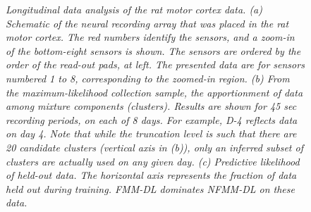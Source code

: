 \documentclass[journal]{IEEEtran}
\begin{document}
\begin{figure}[!htbp]
{ }
  \caption{\small \emph{
{Longitudinal data analysis of the rat motor cortex data. }
(a) Schematic of the neural
recording array that was placed in the rat motor cortex. The red
numbers identify the sensors, and a zoom-in of the bottom-eight
sensors is shown. The sensors are ordered by the order of the
read-out pads, at left. The presented data are for sensors numbered 1 to 8, corresponding to the zoomed-in region. (b) From the maximum-likelihood collection
sample, the apportionment of data among mixture components
(clusters). Results are shown for 45 sec recording periods, on each
of 8 days. For example, D-4 reflects data on day 4. Note that while the truncation level is such that there are 20 candidate clusters (vertical axis in (b)), only an inferred subset of clusters are actually used on any given day. (c) Predictive likelihood of held-out data. The
horizontal axis represents the fraction of data held out during training. 
{FMM-DL dominates NFMM-DL on these data. }}} \label{fig:long}
\end{figure}
\end{document}
